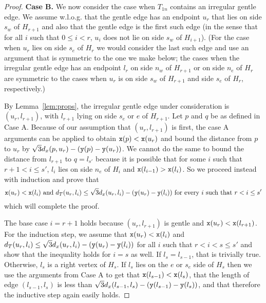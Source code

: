 \begin{proof}
{\bf Case B.} 
We now consider the case when $T_{1n}$ contains an irregular gentle edge. 
We assume
w.l.o.g. that the gentle edge has an endpoint $u_r$ that lies on side $s_w$ of
$H_{r+1}$ and also that the gentle edge is the first such edge (in the sense
that for all $i$ such that $0 \leq i < r$, $u_i$ does not lie on side $s_w$
of $H_{i+1}$). (For the case when $u_r$ lies on side $s_e$ of $H_r$ we would
consider the last such edge and use an argument that is symmetric to the one
we make below; the cases when the irregular gentle edge has an endpoint $l_r$
on side $n_w$ of $H_{r+1}$ or on side
$n_e$ of $H_r$ are symmetric to the cases when $u_r$ is on side $s_w$
of $H_{r+1}$ and side $s_e$ of $H_r$, respectively.)

By Lemma~\ref{lem:props}, the irregular gentle edge under consideration is 
$(u_r,l_{r+1})$, with $l_{r+1}$ lying on side $s_e$ or $e$ of $H_{r+1}$. Let $p$
and $q$ be as defined in Case A. Because of our assumption that $(u_r,l_{r+1})$
is first, the case A arguments can be applied to obtain 
${\tt x}(p) < {\tt x}(u_r)$ and bound the distance from $p$ to
$u_r$ by $\sqrt{3}d_x(p,u_r)-({\tt y}(p)-{\tt y}(u_r))$. We cannot do the same
to bound the distance from $l_{r+1}$ to $q = l_{s'}$ because it is possible that for
some $i$ such that $r+1 < i \leq s'$, $l_i$ lies on side $n_e$ of $H_i$ and
${\tt x}(l_{i-1}) > {\tt x}(l_i)$. So we proceed instead with induction and
prove that
\begin{equation*}
\label{eq:induction}
{\tt x}(u_r) < {\tt x}(l_i) \mbox{ and } d_T(u_r, l_i) \leq \sqrt{3}d_x(u_r, l_i) - ({\tt y}(u_r) - {\tt y}(l_i)) \mbox{ for every $i$ such that } r < i \leq s'
\end{equation*}
which will complete the proof.

The base case $i=r+1$ holds because $(u_r,l_{r+1})$ is gentle and 
${\tt x}(u_r) < {\tt x}(l_{r+1})$. For the induction step, we assume that 
${\tt x}(u_r) < {\tt x}(l_i)$ and 
$d_T(u_r, l_i) \leq \sqrt{3}d_x(u_r, l_i)-({\tt y}(u_r)-{\tt y}(l_i))$ 
for all $i$ such that $r < i < s \leq s'$ and show that the
inequality holds for $i = s$ as well. If $l_s = l_{s-1}$, that is trivially
true. Otherwise, $l_s$ is a right vertex of $H_s$. If
$l_s$ lies on the $e$ or $s_e$ side of $H_s$ then we use the arguments from
Case A to get that ${\tt x}(l_{s-1}) < {\tt x}(l_s)$, that the length of edge
$(l_{s-1}, l_s)$ is less than
$\sqrt{3}d_x(l_{s-1}, l_s) - ({\tt y}(l_{s-1}) - {\tt y}(l_s))$, 
and that therefore the inductive step again easily holds.


\end{proof}
